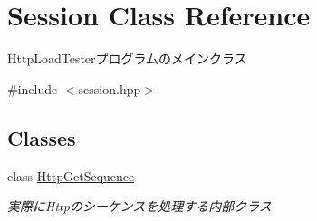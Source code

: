 \hypertarget{class_session}{}\section{Session Class Reference}
\label{class_session}


Http\+Load\+Testerプログラムのメインクラス  




{\ttfamily \#include $<$session.\+hpp$>$}

\subsection*{Classes}
\begin{DoxyCompactItemize}
\item 
class \mbox{\hyperlink{class_session_1_1_http_get_sequence}{Http\+Get\+Sequence}}
\begin{DoxyCompactList}\small\item\em 実際に\+Httpのシーケンスを処理する内部クラス \end{DoxyCompactList}\end{DoxyCompactItemize}
